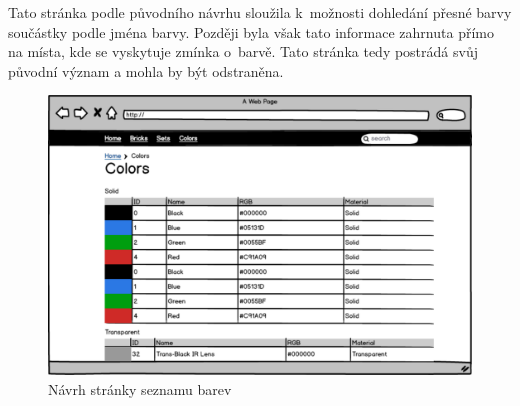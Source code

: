 Tato stránka podle původního návrhu sloužila k~možnosti dohledání přesné barvy součástky podle jména barvy. Později byla však tato informace zahrnuta přímo na místa, kde se vyskytuje zmínka o~barvě. Tato stránka tedy postrádá svůj původní význam a mohla by být odstraněna.

\begin{figure}[htbp]
    \centering
    \includegraphics[width=\textwidth,height=\textheight,keepaspectratio]{pdfs/wireframe_colors.pdf}
    \caption{Návrh stránky seznamu barev}\label{wireframe-barvy}
\end{figure}